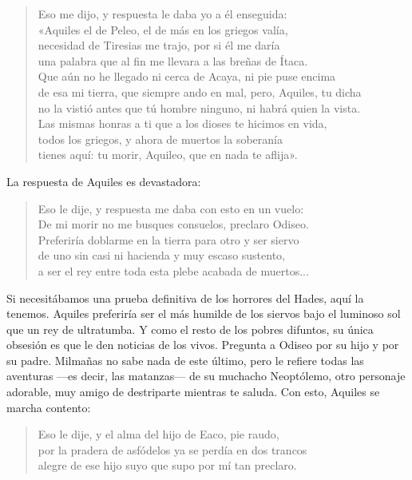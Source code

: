 \documentclass[11pt,a4paper]{article}
\begin{document}
\begin{verse}
Eso me dijo, y respuesta le daba yo a él enseguida:\\
«Aquiles el de Peleo, el de más en los griegos valía,\\
necesidad de Tiresias me trajo, por si él me daría\\
una palabra que al fin me llevara a las breñas de Ítaca.\\
Que aún no he llegado ni cerca de Acaya, ni pie puse encima\\
de esa mi tierra, que siempre ando en mal, pero, Aquiles, tu dicha\\
no la vistió antes que tú hombre ninguno, ni habrá quien la vista.\\
Las mismas honras a ti que a los dioses te hicimos en vida,\\
todos los griegos, y ahora de muertos la soberanía\\
tienes aquí: tu morir, Aquileo, que en nada te aflija».
\end{verse}

La respuesta de Aquiles es devastadora:

\begin{verse}
Eso le dije, y respuesta me daba con esto en un vuelo:\\
De mi morir no me busques consuelos, preclaro Odiseo.\\
Preferiría doblarme en la tierra para otro y ser siervo\\
de uno sin casi ni hacienda y muy escaso sustento,\\
a ser el rey entre toda esta plebe acabada de muertos...
\end{verse}

Si necesitábamos una prueba definitiva de los horrores del Hades, aquí la tenemos. Aquiles preferiría ser el más humilde de los siervos bajo el luminoso sol que un rey de ultratumba. Y como el resto de los pobres difuntos, su única obsesión es que le den noticias de los vivos. Pregunta a Odiseo por su hijo y por su padre. Milmañas no sabe nada de este último, pero le refiere todas las aventuras ---es decir, las matanzas--- de su muchacho Neoptólemo, otro personaje adorable, muy amigo de destriparte mientras te saluda. Con esto, Aquiles se marcha contento:

\begin{verse}
Eso le dije, y el alma del hijo de Eaco, pie raudo,\\
por la pradera de asfódelos ya se perdía en dos trancos\\
alegre de ese hijo suyo que supo por mí tan preclaro.
\end{verse}
\end{document}
